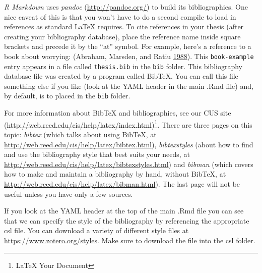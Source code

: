 \documentclass[msc,numbers]{coppe}
\begin{document}
  \emph{R Markdown} uses \emph{pandoc} (\url{http://pandoc.org/}) to build its bibliographies. One nice caveat of this is that you won't have to do a second compile to load in references as standard LaTeX requires. To cite references in your thesis (after creating your bibliography database), place the reference name inside square brackets and precede it by the ``at'' symbol. For example, here's a reference to a book about worrying: (Abraham, Marsden, and Ratiu \protect\hyperlink{ref-book-example}{1988}). This \texttt{book-example} entry appears in a file called \texttt{thesis.bib} in the \texttt{bib} folder. This bibliography database file was created by a program called BibTeX. You can call this file something else if you like (look at the YAML header in the main .Rmd file) and, by default, is to placed in the \texttt{bib} folder.
  
  For more information about BibTeX and bibliographies, see our CUS site (\url{http://web.reed.edu/cis/help/latex/index.html})\footnote{LaTeX Your Document}. There are three pages on this topic: \emph{bibtex} (which talks about using BibTeX, at \url{http://web.reed.edu/cis/help/latex/bibtex.html}), \emph{bibtexstyles} (about how to find and use the bibliography style that best suits your needs, at \url{http://web.reed.edu/cis/help/latex/bibtexstyles.html}) and \emph{bibman} (which covers how to make and maintain a bibliography by hand, without BibTeX, at \url{http://web.reed.edu/cis/help/latex/bibman.html}). The last page will not be useful unless you have only a few sources.
  
  If you look at the YAML header at the top of the main .Rmd file you can see that we can specify the style of the bibliography by referencing the appropriate csl file. You can download a variety of different style files at \url{https://www.zotero.org/styles}. Make sure to download the file into the csl folder.
  
\end{document}
